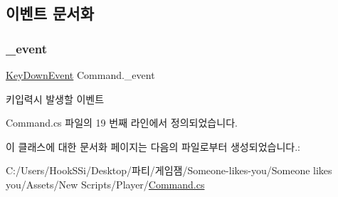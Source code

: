 \subsection{이벤트 문서화}
\mbox{\label{class_command_a04f1a7e0dc8e999e0fca2aa9210f73a3}} 
\subsubsection{\texorpdfstring{\_event}{\_event}}
{\footnotesize\ttfamily \mbox{\hyperlink{class_command_acc714b5e0de57b7f24b2619fff860b9d}{Key\+Down\+Event}} Command.\+\_\+event}



키입력시 발생할 이벤트 



Command.\+cs 파일의 19 번째 라인에서 정의되었습니다.



이 클래스에 대한 문서화 페이지는 다음의 파일로부터 생성되었습니다.\+:\begin{DoxyCompactItemize}
\item 
C\+:/\+Users/\+Hook\+S\+Si/\+Desktop/파티/게임잼/\+Someone-\/likes-\/you/\+Someone likes you/\+Assets/\+New Scripts/\+Player/\mbox{\hyperlink{_command_8cs}{Command.\+cs}}\end{DoxyCompactItemize}
